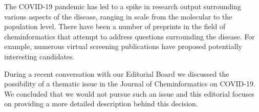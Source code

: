 \documentclass{bmcart}
\begin{document}




 







The COVID-19 pandemic has led to a spike in research output
surrounding various aspects of the disease, ranging in scale from the
molecular to the population level.  There have been a number of
preprints in the field of cheminformatics that attempt to address
questions surrounding the disease. For example, numerous virtual
screening publications have proposed potentially interesting
candidates.

During a recent conversation with our Editorial Board we discussed the
possibility of a thematic issue in the Journal of Cheminformatics on
COVID-19. We concluded that we would not pursue such an issue and this
editorial focuses on providing a more detailed description behind this
decision.
\end{document}
